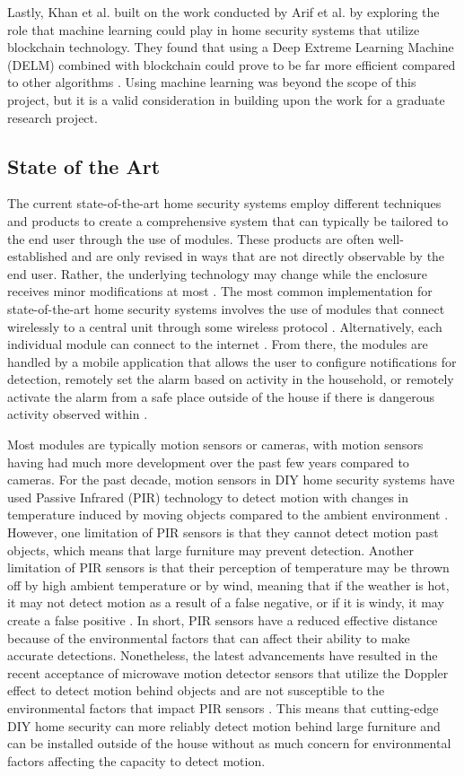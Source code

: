 \documentclass[conference]{IEEEtran}
\begin{document}
Lastly, Khan et al. built on the work conducted by Arif et al. by exploring the role that
machine learning could play in home security systems that utilize blockchain technology.
They found that using a Deep Extreme Learning Machine (DELM) combined with blockchain could
prove to be far more efficient compared to other algorithms \cite{khanEtAl2021}.
Using machine learning was beyond the scope of this project, but it is a valid
consideration in building upon the work for a graduate research project.

\subsection{State of the Art}

The current state-of-the-art home security systems employ different techniques and products
to create a comprehensive system that can typically be tailored to the end user through
the use of modules. These products are often well-established and are only revised in
ways that are not directly observable by the end user. Rather, the underlying technology
may change while the enclosure receives minor modifications at most \cite{sarhan2020}.
The most common implementation for state-of-the-art home security systems involves the
use of modules that connect wirelessly to a central unit through some wireless
protocol \cite{joseMalekian2017}. Alternatively, each individual module can connect
to the internet \cite{sarhan2020}. From there, the modules are handled by a mobile
application that allows the user to configure notifications for detection, remotely
set the alarm based on activity in the household, or remotely activate the alarm
from a safe place outside of the house if there is dangerous activity observed
within \cite{joseMalekian2017}.

Most modules are typically motion sensors or cameras, with motion sensors having had
much more development over the past few years compared to cameras. For the past
decade, motion sensors in DIY home security systems have used Passive Infrared (PIR)
technology to detect motion with changes in temperature induced by moving objects
compared to the ambient environment \cite{sarhan2020}. However, one limitation of
PIR sensors is that they cannot detect motion past objects, which means that large
furniture may prevent detection. Another limitation of PIR sensors is that their
perception of temperature may be thrown off by high ambient temperature or by wind,
meaning that if the weather is hot, it may not detect motion as a result of a
false negative, or if it is windy, it may create a false positive \cite{sarhan2020}.
In short, PIR sensors have a reduced effective distance because of the environmental
factors that can affect their ability to make accurate detections. Nonetheless, the
latest advancements have resulted in the recent acceptance of microwave motion
detector sensors that utilize the Doppler effect to detect motion behind objects
and are not susceptible to the environmental factors that impact PIR sensors \cite{sarhan2020}.
This means that cutting-edge DIY home security can more reliably detect motion behind
large furniture and can be installed outside of the house without as much concern for
environmental factors affecting the capacity to detect motion.
\end{document}
